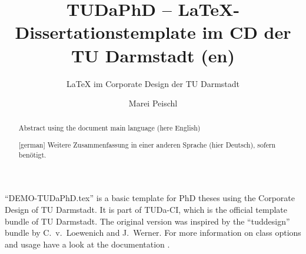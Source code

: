 \documentclass[
	english,%
	accentcolor=9c,%
	ruledheaders=chapter,%
	class=book,%
	thesis={%
		type=dr,
		dr=rernat
	},
	fontsize=11pt,%
	parskip=half-,%
	custommargins=true,%
	marginpar=false,%
]{tudapub}
\title{TUDaPhD -- \LaTeX-Dissertationstemplate im CD der TU Darmstadt (en)}
\subtitle{\LaTeX{} im Corporate Design der TU Darmstadt}
\author{Marei Peischl}
\institute{Institute}
\begin{document}
\frontmatter

\maketitle

\affidavit%
\begin{abstract}
	Abstract using the document main language (here English)
\end{abstract}

\begin{abstract}[german]
	Weitere Zusammenfassung in einer anderen Sprache (hier Deutsch), sofern benötigt.
\end{abstract}

\tableofcontents

\mainmatter


\enquote{DEMO-TUDaPhD.tex} is a basic template for PhD theses using the Corporate Design of TU Darmstadt.
It is part of TUDa-CI, which is the official template bundle of TU Darmstadt. The original version was inspired by the \enquote{tuddesign} bundle by C.~v.~Loewenich and J.~Werner.
For more information on class options and usage have a look at the documentation \cite{tuda-ci}.


\printbibliography
\end{document}

